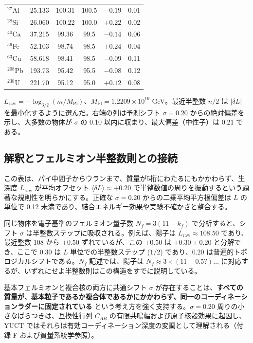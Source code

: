 \documentclass[12pt,a4paper]{article}
\begin{document}
\begin{table}[htbp]
\begin{tabular}{l c c c c c}
			\(^{27}\)Al & 25.133 & 100.31 & 100.5 & \(-0.19\) & 0.01 \\
			\(^{28}\)Si & 26.060 & 100.22 & 100.0 & \(+0.22\) & 0.02 \\
			\(^{40}\)Ca & 37.215 & 99.36  & 99.5  & \(-0.14\) & 0.06 \\
			\(^{56}\)Fe & 52.103 & 98.74  & 98.5  & \(+0.24\) & 0.04 \\
			\(^{63}\)Cu & 58.618 & 98.41  & 98.5  & \(-0.09\) & 0.11 \\
			\(^{208}\)Pb & 193.73 & 95.42  & 95.5  & \(-0.08\) & 0.12 \\
			\(^{238}\)U & 221.70 & 95.12  & 95.0  & \(+0.12\) & 0.08 \\
			\bottomrule
		\end{tabular}
		\par\smallskip
		\footnotesize
		\(L_{\mathrm{raw}} = -\log_{3/2}(m/M_{\mathrm{Pl}})\)、\(M_{\mathrm{Pl}} = 1.2209\times10^{19}\) GeV。最近半整数 \(n/2\) は \(|\delta L|\) を最小化するように選んだ。右端の列は予測シフト \(\sigma = 0.20\) からの絶対偏差を示し、大多数の物体が \(\sigma\) の 0.10 以内に収まり、最大偏差（中性子）は 0.21 である。
	\end{table}
	
	\subsection{解釈とフェルミオン半整数則との接続}
	
	この表は、パイ中間子からウランまで、質量が5桁にわたるにもかかわらず、生深度 \(L_{\mathrm{raw}}\) が平均オフセット \(\langle \delta L \rangle \approx +0.20\) で半整数値の周りを振動するという顕著な規則性を明らかにする。正確な \(\sigma = 0.20\) からの二乗平均平方根偏差は \(L\) の単位で 0.12 未満であり、結合エネルギー効果や実験不確かさと整合する。
	
	同じ物体を電子基準のフェルミオン量子数 \(N_f = 3(11 - k_f)\) で分析すると、シフト \(\sigma\) は半整数ステップに吸収される。例えば、陽子は \(L_{\mathrm{raw}} \approx 108.50\) であり、最近整数 108 から \(+0.50\) ずれているが、この \(+0.50\) は \(+0.30 + 0.20\) と分解でき、ここで 0.30 は \(L\) 単位での半整数ステップ (\(1/2\)) であり、0.20 は普遍的トポロジカルシフトである。\(N_f\) 記述では、陽子は \(N_f \approx 3 \times (11 - 0.5?) \dots\) に対応するが、いずれにせよ半整数則はこの構造をすでに説明している。
	
	基本フェルミオンと複合核の両方に共通シフト \(\sigma\) が存在することは、\textbf{すべての質量が、基本粒子であるか複合体であるかにかかわらず、同一のコーディネーションラダーに固定されている} という考え方を強く支持する。\(\sigma=0.20\) 周りの小さなばらつきは、互換性行列 \(C_{AB}\) の有限共鳴幅および原子核殻効果に起因し、YUCT ではそれらは有効コーディネーション深度の変調として理解される（付録 F および質量系統学参照）。
	
\end{document}

